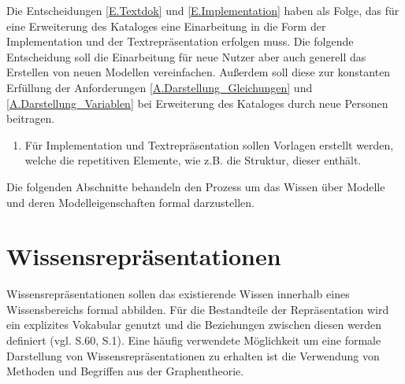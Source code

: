 Die Entscheidungen \ref{E.Textdok} und \ref{E.Implementation} haben als Folge, das für eine Erweiterung des Kataloges eine Einarbeitung in die Form der Implementation und der Textrepräsentation erfolgen muss. Die folgende Entscheidung soll die Einarbeitung für neue Nutzer aber auch generell das Erstellen von neuen Modellen vereinfachen. Außerdem soll diese zur konstanten Erfüllung der Anforderungen \ref{A.Darstellung_Gleichungen} und \ref{A.Darstellung_Variablen} bei Erweiterung des Kataloges durch neue Personen beitragen.
\begin{enumerate}[resume*]
	\item \label{E.Vorlagen}Für Implementation und Textrepräsentation sollen Vorlagen erstellt werden, welche die repetitiven Elemente, wie z.B. die Struktur, dieser enthält. 
\end{enumerate}

Die folgenden Abschnitte behandeln den Prozess um das Wissen über Modelle und deren Modelleigenschaften formal darzustellen.
\section{Wissensrepräsentationen}
\label{Ch:ErstProz:Sec:Wissensrepräsentaionen}
Wissensrepräsentationen sollen das existierende Wissen innerhalb eines Wissensbereichs formal abbilden. Für die Bestandteile der Repräsentation wird ein explizites Vokabular genutzt und die Beziehungen zwischen diesen werden definiert (vgl. \cite{BEN16} S.60, \cite{SEB04} S.1). Eine häufig verwendete Möglichkeit um eine formale Darstellung von Wissensrepräsentationen zu erhalten ist die Verwendung von Methoden und Begriffen aus der Graphentheorie.


